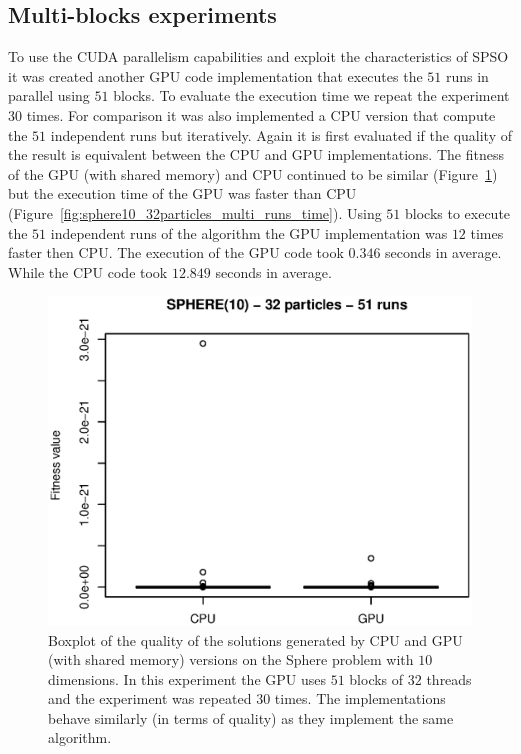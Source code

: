 \documentclass{article}
\begin{document}
    \subsection{Multi-blocks experiments}

    To use the CUDA parallelism capabilities and exploit the characteristics of SPSO it was created another GPU code implementation that executes the $51$ runs in parallel using $51$ blocks. To evaluate the execution time we repeat the experiment $30$ times. For comparison it was also implemented a CPU version that compute the $51$ independent runs but iteratively.
    Again it is first evaluated if the quality of the result is equivalent between the CPU and GPU implementations.
    The fitness of the GPU (with shared memory) and CPU continued to be similar (Figure~\ref{fig:sphere10_32particles_multi_runs_fitness}) but the execution time of the GPU was faster than CPU (Figure~\ref{fig:sphere10_32particles_multi_runs_time}).
    Using $51$ blocks to execute the $51$ independent runs of the algorithm the GPU implementation was $12$ times faster then CPU. The execution of the GPU code took $0.346$ seconds in average. While the CPU code took $12.849$ seconds in average.


    \begin{figure}[!htb]
        \centering
        \includegraphics[width=.7\textwidth]{../img/sphere10_32particles_multi_runs_fitness.eps}
        \caption{Boxplot of the quality of the solutions generated by CPU and GPU (with shared memory) versions on the Sphere problem with $10$ dimensions. In this experiment the GPU uses $51$ blocks of $32$ threads and the experiment was repeated $30$ times. The implementations behave similarly (in terms of quality) as they implement the same algorithm.}
        \label{fig:sphere10_32particles_multi_runs_fitness}
    \end{figure}
\end{document}

